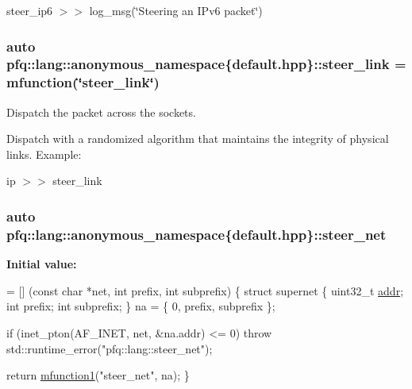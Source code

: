 steer\+\_\+ip6 $>$$>$ log\+\_\+msg(\char`\"{}\+Steering an I\+Pv6 packet\char`\"{}) \hypertarget{namespacepfq_1_1lang_1_1anonymous__namespace_02default_8hpp_03_ac1f3f9a2caf886a1441e62860a4ca058}{
\subsubsection[{steer\+\_\+link}]{\setlength{\rightskip}{0pt plus 5cm}auto pfq\+::lang\+::anonymous\+\_\+namespace\{default.\+hpp\}\+::steer\+\_\+link = {\bf mfunction}(\char`\"{}steer\+\_\+link\char`\"{})}}\label{namespacepfq_1_1lang_1_1anonymous__namespace_02default_8hpp_03_ac1f3f9a2caf886a1441e62860a4ca058}


Dispatch the packet across the sockets. 

Dispatch with a randomized algorithm that maintains the integrity of physical links. Example\+:

ip $>$$>$ steer\+\_\+link \hypertarget{namespacepfq_1_1lang_1_1anonymous__namespace_02default_8hpp_03_a6f8d514e40bb2b0e874fb26d2b416dc3}{
\subsubsection[{steer\+\_\+net}]{\setlength{\rightskip}{0pt plus 5cm}auto pfq\+::lang\+::anonymous\+\_\+namespace\{default.\+hpp\}\+::steer\+\_\+net}}\label{namespacepfq_1_1lang_1_1anonymous__namespace_02default_8hpp_03_a6f8d514e40bb2b0e874fb26d2b416dc3}
{\bfseries Initial value\+:}
\begin{DoxyCode}
= [] (\textcolor{keyword}{const} \textcolor{keywordtype}{char} *net, \textcolor{keywordtype}{int} prefix, \textcolor{keywordtype}{int} subprefix)
        \{
            \textcolor{keyword}{struct }supernet \{
                uint32\_t \hyperlink{namespacepfq_1_1lang_1_1anonymous__namespace_02default_8hpp_03_a13cabe468839119d8d68540e3c60718b}{addr};
                \textcolor{keywordtype}{int}      prefix;
                \textcolor{keywordtype}{int}      subprefix;
            \} na = \{ 0, prefix, subprefix \};

            \textcolor{keywordflow}{if} (inet\_pton(AF\_INET, net, &na.addr) <= 0)
                \textcolor{keywordflow}{throw} std::runtime\_error(\textcolor{stringliteral}{"pfq::lang::steer\_net"});

            \textcolor{keywordflow}{return} \hyperlink{namespacepfq_1_1lang_a68d775c68562fbd0ab9ef213f2519499}{mfunction1}(\textcolor{stringliteral}{"steer\_net"}, na);
        \}
\end{DoxyCode}


